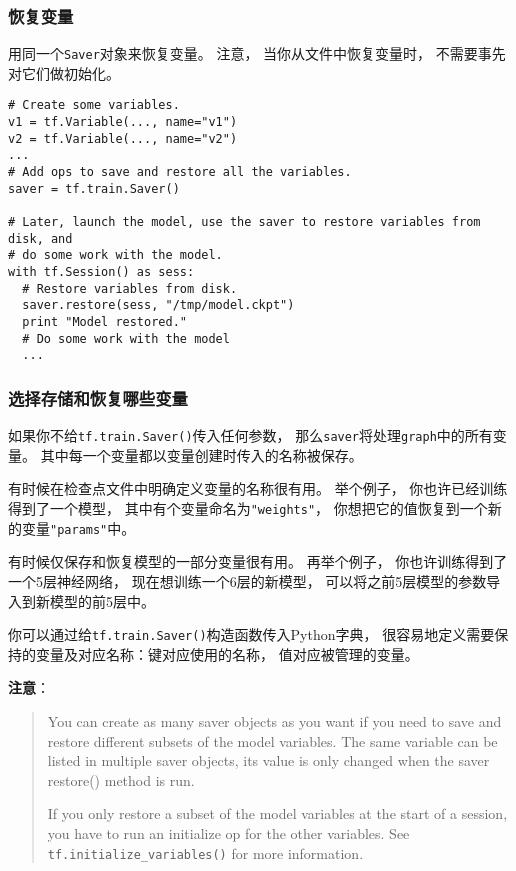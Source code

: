 {\subsubsection{恢复变量}

用同一个\lstinline{Saver}对象来恢复变量。  注意， 当你从文件中恢复变量时， 不需要事先对它们做初始化。

\begin{lstlisting}
# Create some variables.
v1 = tf.Variable(..., name="v1")
v2 = tf.Variable(..., name="v2")
...
# Add ops to save and restore all the variables.
saver = tf.train.Saver()

# Later, launch the model, use the saver to restore variables from disk, and
# do some work with the model.
with tf.Session() as sess:
  # Restore variables from disk.
  saver.restore(sess, "/tmp/model.ckpt")
  print "Model restored."
  # Do some work with the model
  ...
\end{lstlisting}

\subsubsection{选择存储和恢复哪些变量}
如果你不给\lstinline{tf.train.Saver()}传入任何参数， 那么\lstinline{saver}将处理\lstinline{graph}中的所有变量。  其中每一个变量都以变量创建时传入的名称被保存。

有时候在检查点文件中明确定义变量的名称很有用。  举个例子， 你也许已经训练得到了一个模型， 其中有个变量命名为\lstinline{"weights"}， 你想把它的值恢复到一个新的变量\lstinline{"params"}中。

有时候仅保存和恢复模型的一部分变量很有用。  再举个例子， 你也许训练得到了一个5层神经网络， 现在想训练一个6层的新模型， 可以将之前5层模型的参数导入到新模型的前5层中。

你可以通过给\lstinline{tf.train.Saver()}构造函数传入Python字典， 很容易地定义需要保持的变量及对应名称：键对应使用的名称， 值对应被管理的变量。

\textbf{注意}：

\begin{quote}
You can create as many saver objects as you want if you need to save and restore different subsets of the model variables. The same variable can be listed in multiple saver objects, its value is only changed when the saver restore() method is run.

If you only restore a subset of the model variables at the start of a session, you have to run an initialize op for the other variables. See \lstinline{tf.initialize_variables()} for more information.
\end{quote}

}
